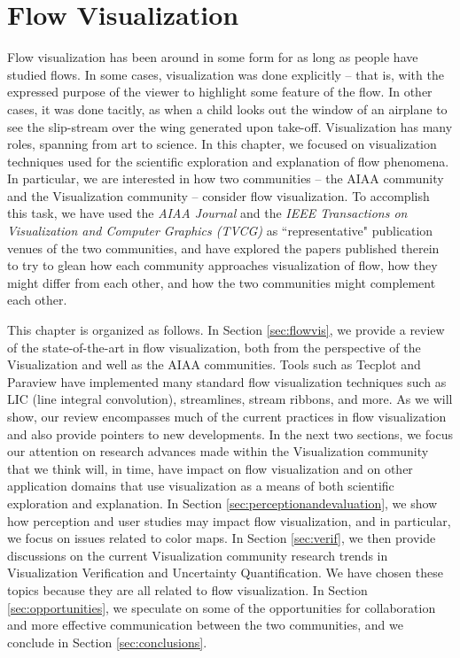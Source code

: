 \chapter{Flow Visualization}
\label{chap:aiaa}

Flow visualization has been around in some form for as long as people have studied flows.  In some
cases, visualization was done explicitly -- that is, with the expressed purpose of the viewer to highlight
some feature of the flow.  In other cases, it was done tacitly, as when a child looks out the window
of an airplane to see the slip-stream over the wing generated upon take-off.  Visualization has
many roles, spanning from art to science.  In this chapter, we focused on visualization techniques
used for the scientific exploration and explanation of flow phenomena.  In particular, we are interested
in how two communities -- the AIAA community and the Visualization community -- consider
flow visualization.  To accomplish this task, we have used the {\em AIAA Journal} and the
{\em IEEE Transactions on Visualization and Computer Graphics (TVCG)} as ``representative" publication
venues of the two communities, and have explored the papers published therein to try to 
glean how each community approaches visualization of flow, how they might differ from each other, 
and how the two communities might complement each other. 

This chapter is organized as follows.  In Section \ref{sec:flowvis}, we provide a review of the state-of-the-art
in flow visualization, both from the perspective of the Visualization and well as the AIAA communities. 
%
Tools such as Tecplot \cite{amtec1996tecplot} and Paraview \cite{squillacote2007paraview} have implemented many 
standard flow visualization techniques such as LIC (line integral convolution), streamlines, stream ribbons, and more. 
As we will show, our review encompasses much of the current practices in 
flow visualization and also provide pointers to new developments. 
%
In the next two sections, we focus our attention on research advances made within the Visualization 
community that we think will, in time, have impact on flow visualization and on other application domains
that use visualization as a means of both scientific exploration and explanation.  
In Section \ref{sec:perceptionandevaluation}, we show how perception and user studies may impact flow visualization, and
in particular, we focus on
issues related to color maps.  In Section \ref{sec:verif}, we then provide
discussions on the current Visualization community research trends in Visualization Verification 
and Uncertainty Quantification.  We have chosen these topics because they are all related to flow visualization.
In Section \ref{sec:opportunities}, we speculate on some of the opportunities for collaboration and
more effective communication between the two communities, and we conclude in Section
\ref{sec:conclusions}.

